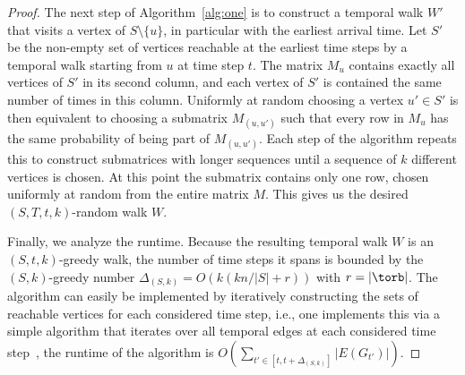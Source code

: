 {\begin{proof}
    The next step of Algorithm~\ref{alg:one} is to construct a
    temporal walk $W'$ that visits a vertex of $S \setminus \{u\}$, in particular
    with the earliest arrival time. Let $S'$ be the non-empty set of vertices
    reachable at the earliest time steps by a temporal walk starting from $u$ at
    time step $t$. The matrix $M_u$ contains exactly all vertices of $S'$ in its
    second column, and each vertex of $S'$ is contained the same number of times in
    this column. Uniformly at random choosing a vertex $u' \in S'$ is then
    equivalent to choosing a submatrix $M_{(u, u')}$ such that every row in $M_u$
    has the same probability of being part of $M_{(u, u')}$.
    Each step of the algorithm repeats this to construct submatrices with longer
    sequences until a sequence of $k$ different vertices is chosen. At this
    point the submatrix contains only one row, chosen uniformly at random from
    the entire matrix $M$. This gives us the desired $(S, T, t, k)$-random walk
    $W$. 
    
    Finally, we analyze the runtime. Because the resulting temporal walk
    $W$ is an $(S, t, k)$-greedy walk, the number of time steps it spans is
    bounded by the $(S, k)$-greedy number $\Delta_{(S, k)} =O(k(k n/|S| + r))$ with
    $r=|\torb|$. The algorithm can easily be implemented by iteratively
    constructing the sets of reachable vertices for each considered time step,
    i.e., one implements this via a simple algorithm that iterates over all
    temporal edges at each considered time step~\cite{WuCYSYW16}, the runtime of
    the algorithm is $O(\sum_{{t'} \in [t, t+\Delta_{(S, k)}]} |E(G_{t'})|)$.
\end{proof}


}
